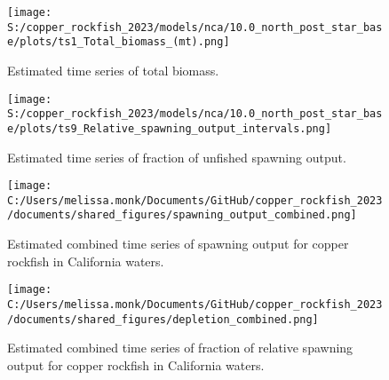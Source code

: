 \documentclass[11pt,
  letterpaper,
]{article}
\begin{document}
\pagebreak

\begin{figure}
{\centering
\texttt{[image: S:/copper\_rockfish\_2023/models/nca/10.0\_north\_post\_star\_base/plots/ts1\_Total\_biomass\_(mt).png]}
}
\caption{Estimated time series of total biomass.\label{fig:tot-bio}}
\end{figure}

\pagebreak

\begin{figure}
{\centering
\texttt{[image: S:/copper\_rockfish\_2023/models/nca/10.0\_north\_post\_star\_base/plots/ts9\_Relative\_spawning\_output\_intervals.png]}
}
\caption{Estimated time series of fraction of unfished spawning output.\label{fig:depl}}
\end{figure}

\pagebreak

\begin{figure}
{\centering
\texttt{[image: C:/Users/melissa.monk/Documents/GitHub/copper\_rockfish\_2023/documents/shared\_figures/spawning\_output\_combined.png]}
}
\caption{Estimated combined time series of spawning output for copper rockfish in California waters.\label{fig:sb-all}}
\end{figure}

\clearpage

\begin{figure}
{\centering
\texttt{[image: C:/Users/melissa.monk/Documents/GitHub/copper\_rockfish\_2023/documents/shared\_figures/depletion\_combined.png]}
}
\caption{Estimated combined time series of fraction of relative spawning output for copper rockfish in California waters.\label{fig:depl-all}}
\end{figure}
\end{document}
